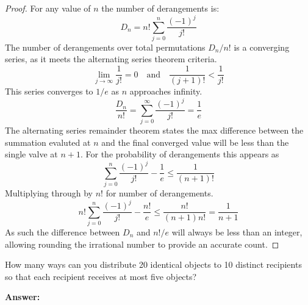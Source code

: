 \documentclass{article}
\begin{document}
\begin{enumerate}[(a)]
    \begin{proof}
    For any value of $n$ the number of derangements is:
    \begin{equation*}
        D_n = n! \sum_{j=0}^{n}\dfrac{(-1)^{j}}{j!}
    \end{equation*}
    The number of derangements over total permutations $D_n / n!$ is a converging series, as it meets the alternating series theorem criteria.
    \begin{equation*}
        \lim_{j \rightarrow \infty}\dfrac{1}{j!} = 0 \quad \text{and} \quad \dfrac{1}{(j+1)!} < \dfrac{1}{j!}
    \end{equation*}
    This series converges to $1/e$ as $n$ approaches infinity.
    \begin{equation*}
        \dfrac{D_n}{n!} = \sum_{j=0}^{\infty}\dfrac{(-1)^{j}}{j!} = \dfrac{1}{e}
    \end{equation*}
    The alternating series remainder theorem states the max difference between the summation evaluted at $n$ and the final converged value will be less than the single valve at $n+1$. For the probability of derangements this appears as
    \begin{equation*}
        \sum_{j=0}^{n}\dfrac{(-1)^{j}}{j!} - \dfrac{1}{e} \le \dfrac{1}{(n+1)!}
    \end{equation*}
    Multiplying through by $n!$ for number of derangements.
    \begin{equation*}
        n!\sum_{j=0}^{n}\dfrac{(-1)^{j}}{j!} - \dfrac{n!}{e} \le \dfrac{n!}{(n+1)n!} = \dfrac{1}{n+1}
    \end{equation*}
    As such the difference between $D_n$ and $n!/e$ will always be less than an integer, allowing rounding the irrational number to provide an accurate count.
    \end{proof}
\end{enumerate}

\setcounter{problem}{7}
\begin{problem} %
How many ways can you distribute 20 identical objects to 10 distinct recipients so that each recipient receives at most five objects?
\end{problem}

\textbf{Answer:}
\end{document}
